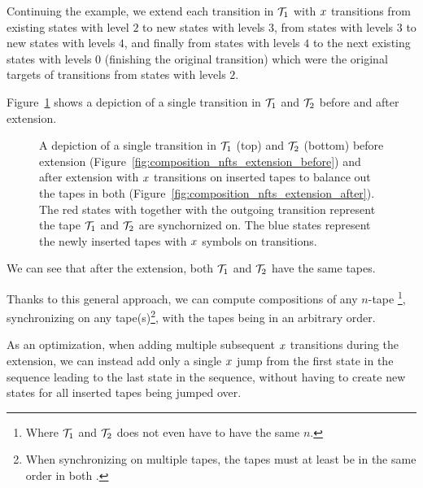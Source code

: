 \begin{example}
  Continuing the example, we extend each \nft transition in $\mathcal{T}_1$ with $x$ transitions from existing states with level $2$ to new states with levels $3$, from states with levels $3$ to new states with levels $4$, and finally from states with levels $4$ to the next existing states with levels $0$ (finishing the original \nft transition) which were the original targets of transitions from states with levels $2$.

  Figure~\ref{fig:composition_nfts_extension} shows a depiction of a single transition in $\mathcal{T}_1$ and $\mathcal{T}_2$ before and after extension.

  \begin{figure}[ht]
    \centering
    \qquad
    \caption{
      A depiction of a single transition in \nfts $\mathcal{T}_1$ (top) and $\mathcal{T}_2$ (bottom) before extension (Figure~\ref{fig:composition_nfts_extension_before}) and after extension with $x$ transitions on inserted tapes to balance out the tapes in both \nfts (Figure~\ref{fig:composition_nfts_extension_after}).
      The red states with together with the outgoing transition represent the tape $\mathcal{T}_1$ and $\mathcal{T}_2$ are synchornized on.
      The blue states represent the newly inserted tapes with $x$ symbols on transitions.
    }
    \label{fig:composition_nfts_extension}%
  \end{figure}

  We can see that after the extension, both $\mathcal{T}_1$ and $\mathcal{T}_2$ have the same tapes.
\end{example}

Thanks to this general approach, we can compute compositions of any $n$-tape \nfts\footnote{Where $\mathcal{T}_1$ and $\mathcal{T}_2$ does not even have to have the same $n$.}, synchronizing on any tape(s)\footnote{When synchronizing on multiple tapes, the tapes must at least be in the same order in both \nfts.}, with the tapes being in an arbitrary order.

As an optimization, when adding multiple subsequent $x$ transitions during the extension, we can instead add only a single $x$ jump from the first state in the sequence leading to the last state in the sequence, without having to create new states for all inserted tapes being jumped over.

